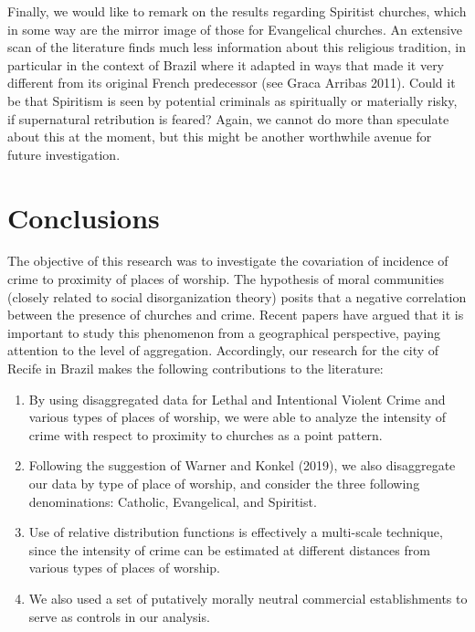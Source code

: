 \documentclass[smallextended]{svjour3}       %
\begin{document}
Finally, we would like to remark on the results regarding Spiritist
churches, which in some way are the mirror image of those for
Evangelical churches. An extensive scan of the literature finds much
less information about this religious tradition, in particular in the
context of Brazil where it adapted in ways that made it very different
from its original French predecessor (see Graca Arribas 2011). Could it
be that Spiritism is seen by potential criminals as spiritually or
materially risky, if supernatural retribution is feared? Again, we
cannot do more than speculate about this at the moment, but this might
be another worthwhile avenue for future investigation.

\hypertarget{conclusions}{%
\section{Conclusions}\label{conclusions}}

The objective of this research was to investigate the covariation of
incidence of crime to proximity of places of worship. The hypothesis of
moral communities (closely related to social disorganization theory)
posits that a negative correlation between the presence of churches and
crime. Recent papers have argued that it is important to study this
phenomenon from a geographical perspective, paying attention to the
level of aggregation. Accordingly, our research for the city of Recife
in Brazil makes the following contributions to the literature:

\begin{enumerate}
\def\labelenumi{\arabic{enumi}.}
\item
  By using disaggregated data for Lethal and Intentional Violent Crime
  and various types of places of worship, we were able to analyze the
  intensity of crime with respect to proximity to churches as a point
  pattern.
\item
  Following the suggestion of Warner and Konkel (2019), we also
  disaggregate our data by type of place of worship, and consider the
  three following denominations: Catholic, Evangelical, and Spiritist.
\item
  Use of relative distribution functions is effectively a multi-scale
  technique, since the intensity of crime can be estimated at different
  distances from various types of places of worship.
\item
  We also used a set of putatively morally neutral commercial
  establishments to serve as controls in our analysis.
\end{enumerate}
\end{document}
